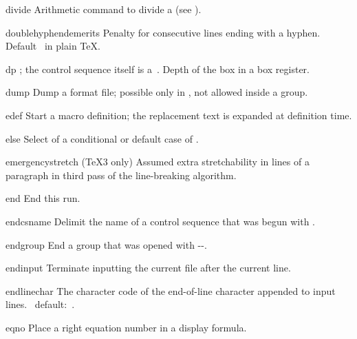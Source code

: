 \item divide
      Arithmetic command to divide a 
      (see ).

\item doublehyphendemerits
      Penalty for consecutive lines ending with a hyphen. 
      Default~ in plain \TeX.

\item dp
      ; the control sequence itself
      is a~.
      Depth of the box in a box register. 

\item dump
      Dump a format file; possible only in \IniTeX, 
      not allowed inside a group.


\item edef
      Start a macro definition; 
      the replacement text is expanded at definition time.

\item else
      Select
       of a conditional 
      or default case of .

\item emergencystretch
      (\TeX3 only) 
      Assumed extra stretchability in lines of a paragraph
      in third pass of the line-breaking algorithm.

\item end
      End this run.

\item endcsname
      Delimit the name of a control sequence that was begun
      with .

\item endgroup
      End a group that was opened with \ver-\begingroup-.

\item endinput
      Terminate inputting the current file after the current line.

\item endlinechar 
      The character code of the end-of-line character 
      appended to input lines.
      \IniTeX\ default:~.

\item eqno
      Place a right equation number in a display formula.

